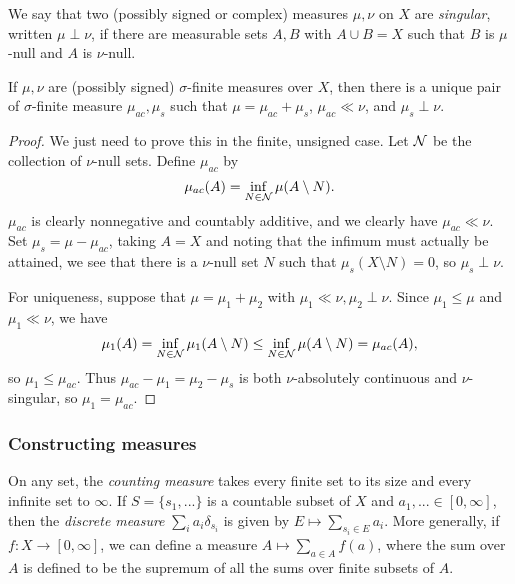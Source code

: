\begin{defn} We say that two (possibly signed or complex) measures $\mu,\nu$ on $X$ are \emph{singular}, written $\mu \perp \nu$, if there are measurable sets $A,B$ with $A \cup B = X$ such that $B$ is $\mu$-null and $A$ is $\nu$-null.
\end{defn}

\begin{thm}\label{lebesgue-decomposition} If $\mu, \nu$ are (possibly signed) $\sigma$-finite measures over $X$, then there is a unique pair of $\sigma$-finite measure $\mu_{ac}, \mu_s$ such that $\mu = \mu_{ac} + \mu_s$, $\mu_{ac} \ll \nu$, and $\mu_s \perp \nu$.
\end{thm}
\begin{proof} We just need to prove this in the finite, unsigned case. Let $\mathcal{N}$ be the collection of $\nu$-null sets. Define $\mu_{ac}$ by
\[
\mu_{ac}(A) = \inf_{N \in \mathcal{N}} \mu(A\setminus N).
\]
$\mu_{ac}$ is clearly nonnegative and countably additive, and we clearly have $\mu_{ac} \ll \nu$. Set $\mu_s = \mu - \mu_{ac}$, taking $A = X$ and noting that the infimum must actually be attained, we see that there is a $\nu$-null set $N$ such that $\mu_s(X\setminus N) = 0$, so $\mu_s \perp \nu$.

For uniqueness, suppose that $\mu = \mu_1 + \mu_2$ with $\mu_1 \ll \nu, \mu_2 \perp \nu$. Since $\mu_1 \le \mu$ and $\mu_1 \ll \nu$, we have
\[
\mu_1(A) = \inf_{N \in \mathcal{N}} \mu_1(A\setminus N) \le \inf_{N \in \mathcal{N}} \mu(A\setminus N) = \mu_{ac}(A),
\]
so $\mu_1 \le \mu_{ac}$. Thus $\mu_{ac} - \mu_1 = \mu_2 - \mu_s$ is both $\nu$-absolutely continuous and $\nu$-singular, so $\mu_1 = \mu_{ac}$.
\end{proof}

\subsubsection{Constructing measures}

\begin{defn} On any set, the \emph{counting measure} takes every finite set to its size and every infinite set to $\infty$. If $S = \{s_1, ...\}$ is a countable subset of $X$ and $a_1, ... \in [0,\infty]$, then the \emph{discrete measure} $\sum_i a_i\delta_{s_i}$ is given by $E \mapsto \sum_{s_i \in E} a_i$. More generally, if $f : X \rightarrow [0,\infty]$, we can define a measure $A \mapsto \sum_{a \in A} f(a)$, where the sum over $A$ is defined to be the supremum of all the sums over finite subsets of $A$.
\end{defn}

